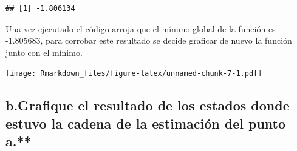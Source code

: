 \documentclass[
]{article}
\newenvironment{Shaded}{\begin{snugshade}}{\end{snugshade}}
\newcommand{\AttributeTok}[1]{\textcolor[rgb]{0.13,0.29,0.53}{#1}}
\newcommand{\DecValTok}[1]{\textcolor[rgb]{0.00,0.00,0.81}{#1}}
\newcommand{\FloatTok}[1]{\textcolor[rgb]{0.00,0.00,0.81}{#1}}
\newcommand{\FunctionTok}[1]{\textcolor[rgb]{0.13,0.29,0.53}{\textbf{#1}}}
\newcommand{\NormalTok}[1]{#1}
\newcommand{\OtherTok}[1]{\textcolor[rgb]{0.56,0.35,0.01}{#1}}
\newcommand{\SpecialCharTok}[1]{\textcolor[rgb]{0.81,0.36,0.00}{\textbf{#1}}}
\newcommand{\StringTok}[1]{\textcolor[rgb]{0.31,0.60,0.02}{#1}}
\begin{document}
\begin{Shaded}
\end{Shaded}

\begin{verbatim}
## [1] -1.806134
\end{verbatim}

Una vez ejecutado el código arroja que el mínimo global de la función es
-1.805683, para corrobar este resultado se decide graficar de nuevo la
función junto con el mínimo.

\begin{Shaded}
\end{Shaded}

\texttt{[image: Rmarkdown\_files/figure-latex/unnamed-chunk-7-1.pdf]}

\hypertarget{b.grafique-el-resultado-de-los-estados-donde-estuvo-la-cadena-de-la-estimaciuxf3n-del-punto-a.}{%
\subsection{b.Grafique el resultado de los estados donde estuvo la
cadena de la estimación del punto
a.**}\label{b.grafique-el-resultado-de-los-estados-donde-estuvo-la-cadena-de-la-estimaciuxf3n-del-punto-a.}}
\end{document}
